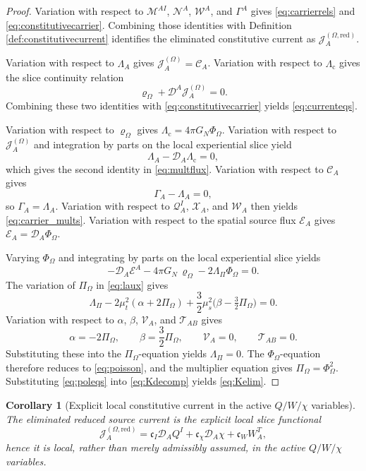 \documentclass[11pt]{article}
\newcommand{\SpatialD}{\mathcal D}
\newcommand{\FlowPot}{\Phi_\Omega}
\newcommand{\BalanceField}{\Pi_\Omega}
\newcommand{\BalMult}{\Lambda_\Pi}
\newcommand{\SourceDensity}{\varrho_\Omega}
\newcommand{\SourceCurrent}{\mathcal J^{(\Omega)}}
\newcommand{\SourceCurrentRed}{\mathcal J^{(\Omega,\mathrm{red})}}
\newcommand{\ConstCurrent}{\mathcal C}
\newcommand{\QCarrier}{\mathcal Q}
\newcommand{\ChiCarrier}{\mathcal X}
\newcommand{\TransCarrier}{\mathcal W}
\newcommand{\ContMult}{\Lambda_{\mathrm c}}
\newcommand{\CurrentMult}{\Lambda}
\newcommand{\ConstGamma}{\Gamma}
\newcommand{\QMult}{\mathscr M}
\newcommand{\ChiMult}{\mathscr N}
\newcommand{\TransMult}{\mathscr W}
\newcommand{\SourceFlux}{\mathcal E}
\newtheorem{corollary}{Corollary}
\begin{document}
\begin{proof}
Variation with respect to \(\QMult^{AI}\), \(\ChiMult^A\), \(\TransMult^A\), and \(\ConstGamma^A\) gives \eqref{eq:carrierrels} and \eqref{eq:constitutivecarrier}. Combining those identities with Definition \ref{def:constitutivecurrent} identifies the eliminated constitutive current as \(\SourceCurrentRed_A\).

Variation with respect to \(\CurrentMult_A\) gives \(\SourceCurrent_A=\ConstCurrent_A\). Variation with respect to \(\ContMult\) gives the slice continuity relation
\[
\SourceDensity+\SpatialD^A\SourceCurrent_A=0.
\]
Combining these two identities with \eqref{eq:constitutivecarrier} yields \eqref{eq:currenteqs}.

Variation with respect to \(\SourceDensity\) gives \(\ContMult=4\pi G_N\FlowPot\). Variation with respect to \(\SourceCurrent_A\) and integration by parts on the local experiential slice yield
\[
\CurrentMult_A-\SpatialD_A\ContMult=0,
\]
which gives the second identity in \eqref{eq:multflux}. Variation with respect to \(\ConstCurrent_A\) gives
\[
\ConstGamma_A-\CurrentMult_A=0,
\]
so \(\ConstGamma_A=\CurrentMult_A\). Variation with respect to \(\QCarrier^I_A\), \(\ChiCarrier_A\), and \(\TransCarrier_A\) then yields \eqref{eq:carrier_mults}. Variation with respect to the spatial source flux \(\SourceFlux_A\) gives \(\SourceFlux_A=\SpatialD_A\FlowPot\).

Varying \(\FlowPot\) and integrating by parts on the local experiential slice yields
\[
-\SpatialD_A\SourceFlux^A-4\pi G_N\,\SourceDensity-2\BalMult\FlowPot=0.
\]
The variation of \(\BalanceField\) in \eqref{eq:laux} gives
\[
\BalMult
-2\mu_t^2(\alpha+2\BalanceField)
+\frac32\mu_s^2\bigl(\beta-\tfrac32\BalanceField\bigr)=0.
\]
Variation with respect to \(\alpha\), \(\beta\), \(\mathcal V_A\), and \(\mathcal T_{AB}\) gives
\[
\alpha=-2\BalanceField,
\qquad
\beta=\frac32\BalanceField,
\qquad
\mathcal V_A=0,
\qquad
\mathcal T_{AB}=0.
\]
Substituting these into the \(\BalanceField\)-equation yields \(\BalMult=0\). The \(\FlowPot\)-equation therefore reduces to \eqref{eq:poisson}, and the multiplier equation gives \(\BalanceField=\FlowPot^2\). Substituting \eqref{eq:poleqs} into \eqref{eq:Kdecomp} yields \eqref{eq:Kelim}.
\end{proof}

\begin{corollary}[Explicit local constitutive current in the active \texorpdfstring{\(Q/W/\chi\)}{Q/W/chi} variables]
\label{cor:localcurrent}
The eliminated reduced source current is the explicit local slice functional
\begin{equation}
\SourceCurrentRed_A
=
\mathfrak c_I\SpatialD_AQ^I
+\mathfrak c_\chi\SpatialD_A\chi
+\mathfrak c_WW_A^T,
\label{eq:localcurrent}
\end{equation}
hence it is local, rather than merely admissibly assumed, in the active \(Q/W/\chi\) variables.
\end{corollary}
\end{document}
